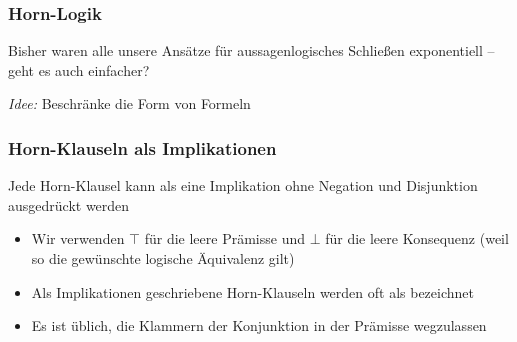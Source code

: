 \documentclass[aspectratio=1610,onlymath]{beamer}
\begin{document}
\begin{frame}\frametitle{Horn-Logik}

Bisher waren alle unsere Ansätze für aussagenlogisches Schließen exponentiell -- geht es auch einfacher?
\bigskip\pause

\emph{Idee:} Beschränke die Form von Formeln
\bigskip


\pause
{}

\end{frame}

\begin{frame}\frametitle{Horn-Klauseln als Implikationen}

Jede Horn-Klausel kann als eine Implikation ohne Negation und Disjunktion ausgedrückt werden
\bigskip


\begin{itemize}
\item Wir verwenden $\top$ für die leere Prämisse und $\bot$ für die leere Konsequenz (weil so die gewünschte logische Äquivalenz gilt)
\item Als Implikationen geschriebene Horn-Klauseln werden oft als  bezeichnet
\item Es ist üblich, die Klammern der Konjunktion in der Prämisse wegzulassen
\end{itemize}

\end{frame}
\end{document}
